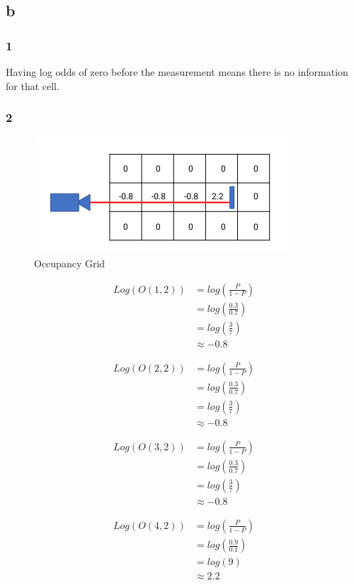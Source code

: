 \documentclass[12pt]{article}
\begin{document}
\subsection{b}
\subsubsection{1}
Having log odds of zero before the measurement means there is no information for that cell.
\subsubsection{2}

\begin{figure}[H]
    \centering
    \includegraphics[width=0.6\linewidth]{7b.png}
    \caption{Occupancy Grid}
\end{figure}

\begin{align*}
    Log(O(1,2)) & = log(\frac{P}{1-P})   \\
                & = log(\frac{0.3}{0.7}) \\
                & = log(\frac{3}{7})     \\
                & \approx -0.8
\end{align*}

\begin{align*}
    Log(O(2,2)) & = log(\frac{P}{1-P})   \\
                & = log(\frac{0.3}{0.7}) \\
                & = log(\frac{3}{7})     \\
                & \approx -0.8
\end{align*}

\begin{align*}
    Log(O(3,2)) & = log(\frac{P}{1-P})   \\
                & = log(\frac{0.3}{0.7}) \\
                & = log(\frac{3}{7})     \\
                & \approx -0.8
\end{align*}

\begin{align*}
    Log(O(4,2)) & = log(\frac{P}{1-P})   \\
                & = log(\frac{0.9}{0.1}) \\
                & = log(9)               \\
                & \approx 2.2
\end{align*}
\end{document}
